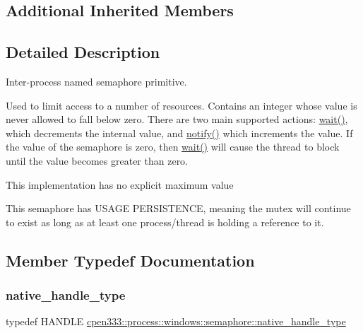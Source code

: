 \subsection*{Additional Inherited Members}


\subsection{Detailed Description}
Inter-\/process named semaphore primitive. 

Used to limit access to a number of resources. Contains an integer whose value is never allowed to fall below zero. There are two main supported actions\+: \hyperlink{classcpen333_1_1process_1_1windows_1_1semaphore_a523d89b784ed47ade79d4ecf836f042d}{wait()}, which decrements the internal value, and \hyperlink{classcpen333_1_1process_1_1windows_1_1semaphore_a7f1443d55e1112e7b2a15334bafc958b}{notify()} which increments the value. If the value of the semaphore is zero, then \hyperlink{classcpen333_1_1process_1_1windows_1_1semaphore_a523d89b784ed47ade79d4ecf836f042d}{wait()} will cause the thread to block until the value becomes greater than zero.

This implementation has no explicit maximum value

This semaphore has U\+S\+A\+GE P\+E\+R\+S\+I\+S\+T\+E\+N\+CE, meaning the mutex will continue to exist as long as at least one process/thread is holding a reference to it. 

\subsection{Member Typedef Documentation}
\mbox{\label{classcpen333_1_1process_1_1windows_1_1semaphore_a07f523e9a1edf0ae8afa2f21487a1953}} 
\subsubsection{\texorpdfstring{native\+\_\+handle\+\_\+type}{native\_handle\_type}}
{\footnotesize\ttfamily typedef H\+A\+N\+D\+LE \hyperlink{classcpen333_1_1process_1_1posix_1_1semaphore_ad63150e5c8c196a84a7b214462756f1a}{cpen333\+::process\+::windows\+::semaphore\+::native\+\_\+handle\+\_\+type}}



